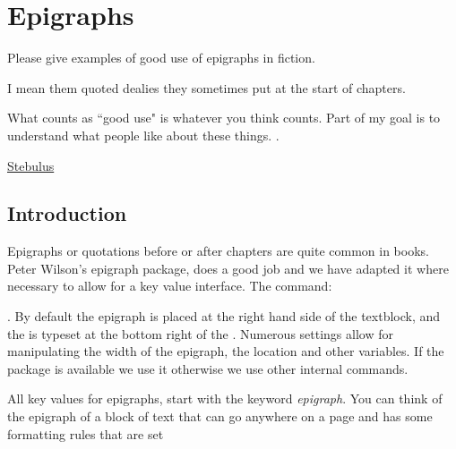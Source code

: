 \makeatletter\@specialfalse
{}



\chapter{Epigraphs}
\label{c:epigraphs}

\epigraph{Please give examples of good use of epigraphs in fiction.

I mean them quoted dealies they sometimes put at the start of chapters.

What counts as ``good use" is whatever you think counts. Part of my goal is to understand what people like about these things.
.}{\href{http://ask.metafilter.com/207423/Good-use-of-epigraphs-in-fiction}{Stebulus}}



\section{Introduction}

Epigraphs or quotations before or after chapters are quite common in books. Peter Wilson's epigraph package, 
does a good job and we have adapted it where necessary to allow for a key value interface. The command:

. By default the epigraph is placed at the right
hand side of the textblock, and the  is typeset at the bottom right of the . 
Numerous settings allow for manipulating the width of the epigraph, the location and other 
variables. If the package is available we use it otherwise we use other internal commands.

All key values for epigraphs, start with the keyword \emph{epigraph}. You can think of the epigraph of a block of text that can go anywhere on a page and has some formatting rules that are set 

